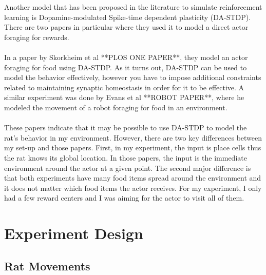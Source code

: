 \documentclass[conference]{IEEEtran}
\begin{document}
Another model that has been proposed in the literature to simulate reinforcement learning is Dopamine-modulated Spike-time dependent plasticity (DA-STDP). There are two papers in particular where they used it to model a direct actor foraging for rewards. \\
\\
In a paper by Skorkheim et al **PLOS ONE PAPER**, they model an actor foraging for food using DA-STDP. As it turns out, DA-STDP can be used to model the behavior effectively, however you have to impose additional constraints related to maintaining synaptic homeostasis in order for it to be effective. A similar experiment was done by Evans et al **ROBOT PAPER**, where he modeled the movement of a robot foraging for food in an environment. \\
\\
These papers indicate that it may be possible to use DA-STDP to model the rat's behavior in my environment. However, there are two key differences between my set-up and those papers. First, in my experiment, the input is place cells thus the rat knows its global location. In those papers, the input is the immediate environment around the actor at a given point. The second major difference is that both experiments have many food items spread around the environment and it does not matter which food items the actor receives. For my experiment, I only had a few reward centers and I was aiming for the actor to visit all of them. 



\section{Experiment Design}

\subsection{Rat Movements}
\end{document}
